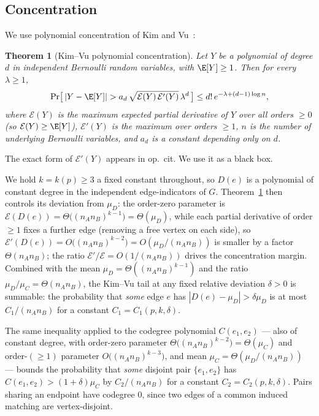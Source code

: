 \documentclass[11pt,a4paper]{article}
\newtheorem{theorem}{Theorem}[section]
\theoremstyle{definition}
\theoremstyle{remark}
\begin{document}
\subsection{Concentration}

We use polynomial concentration of Kim and
Vu~\cite{kimVuConcentration2000}:

\begin{theorem}[Kim--Vu polynomial concentration]
\label{thm:kim-vu}
Let $Y$ be a polynomial of degree $d$ in independent Bernoulli random
variables, with $\E[Y] \geq 1$. Then for every $\lambda \geq 1$,
\[
\Pr\bigl[\,|Y - \E[Y]| > a_d\,\sqrt{\mathcal{E}(Y)\,\mathcal{E}'(Y)}\,
\lambda^d\,\bigr]
\leq d!\,e^{-\lambda + (d-1)\log n},
\]
where $\mathcal{E}(Y)$ is the maximum expected partial derivative of
$Y$ over all orders $\geq 0$ (so $\mathcal{E}(Y) \geq \E[Y]$),
$\mathcal{E}'(Y)$ is the maximum over orders $\geq 1$, $n$ is the
number of underlying Bernoulli variables, and $a_d$ is a constant
depending only on $d$.
\end{theorem}

The exact form of $\mathcal{E}'(Y)$ appears in op.\ cit. We use it
as a black box.

We hold $k = k(p) \geq 3$ a fixed constant throughout, so $D(e)$ is
a polynomial of constant degree in the independent edge-indicators
of $G$. Theorem~\ref{thm:kim-vu} then controls its deviation from
$\mu_D$: the order-zero parameter is
$\mathcal{E}(D(e)) = \Theta\bigl((n_A n_B)^{k-1}\bigr) = \Theta(\mu_D)$,
while each partial derivative of order $\geq 1$ fixes a further edge
(removing a free vertex on each side), so
$\mathcal{E}'(D(e)) = O\bigl((n_A n_B)^{k-2}\bigr) = O(\mu_D/(n_A n_B))$
is smaller by a factor $\Theta(n_A n_B)$; the ratio
$\mathcal{E}'/\mathcal{E} = O(1/(n_A n_B))$ drives the concentration
margin. Combined with the mean $\mu_D = \Theta((n_A n_B)^{k-1})$ and
the ratio $\mu_D / \mu_C = \Theta(n_A n_B)$, the Kim--Vu tail at any fixed
relative deviation $\delta > 0$ is summable: the probability that
\emph{some} edge $e$ has $|D(e) - \mu_D| > \delta \mu_D$ is at most
$C_1 / (n_A n_B)$ for a constant $C_1 = C_1(p, k, \delta)$.

The same inequality applied to the codegree polynomial
$C(e_1, e_2)$ --- also of constant degree, with order-zero parameter
$\Theta\bigl((n_A n_B)^{k-2}\bigr) = \Theta(\mu_C)$ and order-$(\geq\!1)$
parameter $O\bigl((n_A n_B)^{k-3}\bigr)$, and mean
$\mu_C = \Theta(\mu_D / (n_A n_B))$ --- bounds the probability that
\emph{some} disjoint pair $\{e_1, e_2\}$ has
$C(e_1, e_2) > (1+\delta)\mu_C$ by $C_2 / (n_A n_B)$ for a constant
$C_2 = C_2(p, k, \delta)$. Pairs sharing an endpoint have codegree
$0$, since two edges of a common induced matching are
vertex-disjoint.
\end{document}
